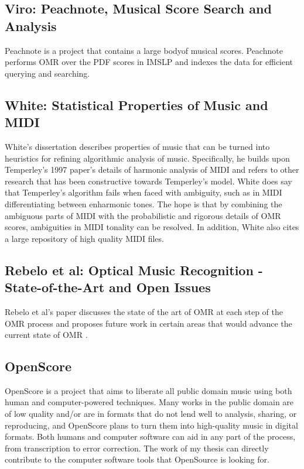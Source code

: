 \subsection{Viro: Peachnote, Musical Score Search and Analysis}
Peachnote \cite{peachnote} is a project that contains a large bodyof musical scores. Peachnote performs OMR over the PDF scores in IMSLP and indexes the data for efficient querying and searching.  

\subsection{White: Statistical Properties of Music and MIDI}
White's dissertation \cite{white} describes properties of music that can be turned into heuristics for refining algorithmic analysis of music. Specifically, he builds upon Temperley's 1997 \cite{temperley} paper's details of harmonic analysis of MIDI and refers to other research that has been constructive towards Temperley's model. White does say that Temperley's algorithm fails when faced with ambiguity, such as in MIDI differentiating between enharmonic tones. The hope is that by combining the ambiguous parts of MIDI with the probabilistic and rigorous details of OMR scores, ambiguities in MIDI tonality can be resolved. In addition, White also cites a large repository of high quality MIDI files. 

\subsection{Rebelo et al: Optical Music Recognition - State-of-the-Art and Open Issues}
Rebelo et al's paper discusses the state of the art of OMR at each step of the OMR process and proposes future work in certain areas that would advance the current state of OMR \cite{rebelo}.

\subsection{OpenScore}
OpenScore is a project that aims to liberate all public domain music using both human and computer-powered techniques. Many works in the public domain are of low quality and/or are in formats that do not lend well to analysis, sharing, or reproducing, and OpenScore plans to turn them into high-quality music in digital formats. Both humans and computer software can aid in any part of the process, from transcription to error correction. The work of my thesis can directly contribute to the computer software tools that OpenSource is looking for. 

